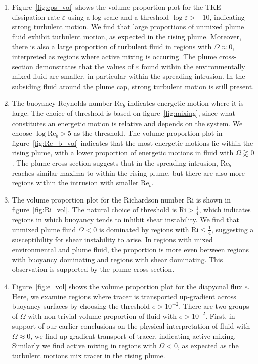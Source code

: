 \documentclass[a4paper]{article}
\begin{document}
\begin{enumerate}[label=(\alph*)]
	\item Figure~\ref{fig:eps_vol} shows the volume proportion plot for the TKE dissipation rate $\varepsilon$
		using a log-scale and a threshold $\log \varepsilon > -10$, indicating strong turbulent motion. We
		find that large proportions of unmixed plume fluid exhibit turbulent motion, as expected in the rising
		plume. Moreover, there is also a large proportion of turbulent fluid in regions with $\Omega \approx
		0$, interpreted as regions where active mixing is occuring. The plume cross-section demonstrates that
		the values of $\varepsilon$ found within the environmentally mixed fluid are smaller, in particular
		within the spreading intrusion. In the subsiding fluid around the plume cap, strong turbulent motion
		is still present.

	\item The buoyancy Reynolds number $\mathrm{Re}_b$ indicates energetic motion where it is large. The
		choice of threshold is based on figure~\ref{fig:mixing}, since what constitutes an energetic motion is
		relative and depends on the system. We choose $\log \mathrm{Re}_b > 5$ as the threshold. The volume
		proportion plot in figure~\ref{fig:Re_b_vol} indicates that the most energetic motions lie within the
		rising plume, with a lower proportion of energetic motions in fluid with $\Omega \gtrapprox 0$. The
		plume cross-section suggests that in the spreading intrusion, $\mathrm{Re}_b$ reaches similar maxima
		to within the rising plume, but there are also more regions within the intrusion with smaller
		$\mathrm{Re}_b$.

	\item The volume proportion plot for the Richardson number $\mathrm{Ri}$ is shown in
		figure~\ref{fig:Ri_vol}. The natural choice of threshold is $\mathrm{Ri} > \frac{1}{4}$, which
		indicates regions in which buoyancy tends to inhibit shear instability. We find that unmixed plume
		fluid $\Omega < 0$ is dominated by regions with $\mathrm{Ri} \le \frac{1}{4}$, suggesting
		a susceptibility for shear instability to arise. In regions with mixed environmental and plume fluid,
		the proportion is more even between regions with buoyancy dominating and regions with shear
		dominating. This observation is supported by the plume cross-section.

	\item Figure~\ref{fig:e_vol} shows the volume proportion plot for the diapycnal flux $e$. Here, we examine
		regions where tracer is transported up-gradient across buoyancy surfaces by choosing the threshold $e
		> 10^{-2}$. There are two groups of $\Omega$ with non-trivial volume proportion of fluid with $e >
		10^{-2}$. First, in support of our earlier conclusions on the physical interpretation of fluid with
		$\Omega \approx 0$, we find up-gradient transport of tracer, indicating active mixing. Similarly we
		find active mixing in regions with $\Omega < 0$, as expected as the turbulent motions mix tracer in
		the rising plume.
\end{enumerate}
\end{document}
